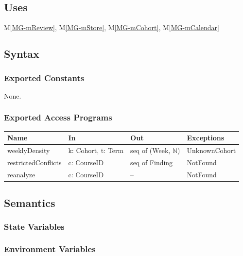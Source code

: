 \documentclass[12pt, titlepage]{article}
\newcommand{\mref}[1]{M\ref{MG-#1}}
\begin{document}
\subsection{Uses}
\mref{mReview}, \mref{mStore}, \mref{mCohort}, \mref{mCalendar}

\subsection{Syntax}

\subsubsection{Exported Constants}
None.

\subsubsection{Exported Access Programs}
\begin{center}\small
\begin{tabular}{>{\raggedright\arraybackslash}p{3.3cm} >{\raggedright\arraybackslash}p{4.1cm} >{\raggedright\arraybackslash}p{3.4cm} >{\raggedright\arraybackslash}p{4.0cm}}
\hline
\textbf{Name} & \textbf{In} & \textbf{Out} & \textbf{Exceptions} \\
\hline
weeklyDensity & k: Cohort, t: Term & seq of (Week, $\mathbb{N}$) & UnknownCohort \\
restrictedConflicts & c: CourseID & seq of Finding & NotFound \\
reanalyze & c: CourseID & -- & NotFound \\
\hline
\end{tabular}
\end{center}

\subsection{Semantics}

\subsubsection{State Variables}


\subsubsection{Environment Variables}

\end{document}
